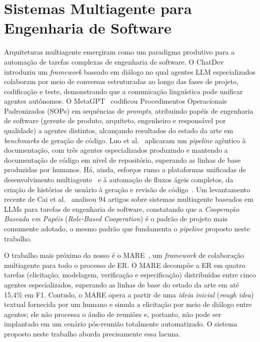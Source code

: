 \section{Sistemas Multiagente para Engenharia de Software}

Arquiteturas multiagente emergiram como um paradigma produtivo para a automação de tarefas complexas de engenharia de software. O ChatDev~\cite{qian2024chatdev} introduziu um \textit{framework} baseado em diálogo no qual agentes LLM especializados colaboram por meio de conversas estruturadas ao longo das fases de projeto, codificação e teste, demonstrando que a comunicação linguística pode unificar agentes autônomos. O MetaGPT~\cite{hong2024metagpt} codificou Procedimentos Operacionais Padronizados (SOPs) em sequências de \textit{prompts}, atribuindo papéis de engenharia de software (gerente de produto, arquiteto, engenheiro e responsável por qualidade) a agentes distintos, alcançando resultados do estado da arte em \textit{benchmarks} de geração de código. Luo et al.~\cite{luo2024repoagent} aplicaram um \textit{pipeline} agêntico à documentação, com três agentes especializados produzindo e mantendo a documentação de código em nível de repositório, superando as linhas de base produzidas por humanos. Há, ainda, esforços rumo a plataformas unificadas de desenvolvimento multiagente~\cite{sami2024experimentingmultiagent} e à automação de fluxos ágeis completos, da criação de histórias de usuário à geração e revisão de código~\cite{sanwal2024autonomous}. Um levantamento recente de Cai et al.~\cite{cai2025designing} analisou 94 artigos sobre sistemas multiagente baseados em LLMs para tarefas de engenharia de software, constatando que a \textit{Cooperação Baseada em Papéis} (\textit{Role-Based Cooperation}) é o padrão de projeto mais comumente adotado, o mesmo padrão que fundamenta o \textit{pipeline} proposto neste trabalho.

O trabalho mais próximo do nosso é o MARE~\cite{jin2024mare}, um \textit{framework} de colaboração multiagente para todo o processo de ER. O MARE decompõe a ER em quatro tarefas (elicitação, modelagem, verificação e especificação) distribuídas entre cinco agentes especializados, superando as linhas de base do estado da arte em até 15,4\% em F1. Contudo, o MARE opera a partir de uma \textit{ideia inicial} (\textit{rough idea}) textual fornecida por um humano e simula a elicitação por meio de diálogo entre agentes; ele não processa o áudio de reuniões e, portanto, não pode ser implantado em um cenário pós-reunião totalmente automatizado. O sistema proposto neste trabalho aborda precisamente essa lacuna.


